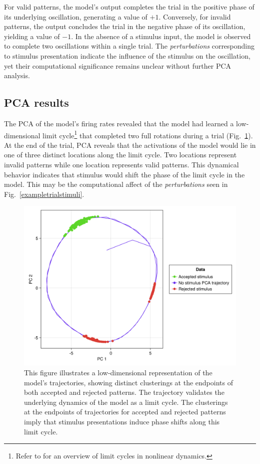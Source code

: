 \documentclass[conference]{IEEEtran}
\begin{document}
For valid patterns, the model's output completes the trial in the positive phase of its underlying oscillation, generating a value of $+1$. Conversely, for invalid patterns, the output concludes the trial in the negative phase of its oscillation, yielding a value of $-1$. In the absence of a stimulus input, the model is observed to complete two oscillations within a single trial. The \textit{perturbations} corresponding to stimulus presentation indicate the influence of the stimulus on the oscillation, yet their computational significance remains unclear without further PCA analysis.

\subsection{PCA results}

The PCA of the model's firing rates revealed that the model had learned a low-dimensional limit cycle\footnote{Refer to \cite{strogatz2018nonlinear} for an overview of limit cycles in nonlinear dynamics.} that completed two full rotations during a trial (Fig.~\ref{pcasummary}). At the end of the trial, PCA reveals that the activations of the model would lie in one of three distinct locations along the limit cycle. Two locations represent invalid patterns while one location represents valid patterns. This dynamical behavior indicates that stimulus would shift the phase of the limit cycle in the model. This may be the computational affect of the \textit{perturbations}  seen in Fig.~\ref{exampletrialstimuli}.

\begin{figure}[htbp]
\centerline{\includegraphics[scale=0.10]{pca_summary.png}}
\caption{This figure illustrates a low-dimensional representation of the model's trajectories, showing distinct clusterings at the endpoints of both accepted and rejected patterns. The trajectory validates the underlying dynamics of the model as a limit cycle. The clusterings at the endpoints of trajectories for accepted and rejected patterns imply that stimulus presentations induce phase shifts along this limit cycle.}
\label{pcasummary}
\end{figure}
\end{document}
